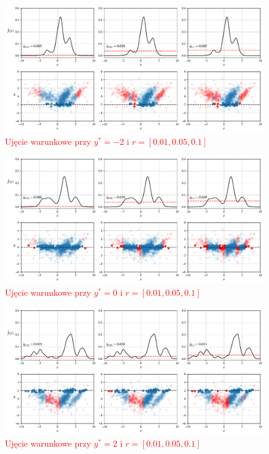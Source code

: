 \documentclass[12pt,a4paper,oneside]{book}
\theoremstyle{definition}
\begin{document}
\begin{figure}[H]
    \centering
    \includegraphics[scale=0.45]{synthetic_data_outliers_ckde_extra1}
    \vspace{-0.5cm} 
    \caption{\textcolor{red}{Ujęcie warunkowe przy $y^*=-2$ i $r=[0.01, 0.05, 0.1]$}}
\end{figure}

\begin{figure}[H]
    \centering
    \includegraphics[scale=0.45]{synthetic_data_outliers_ckde_extra2}
    \vspace{-0.5cm} 
    \caption{\textcolor{red}{Ujęcie warunkowe przy $y^*=0$ i $r=[0.01, 0.05, 0.1]$}}
\end{figure}

\begin{figure}[H]
    \centering
    \includegraphics[scale=0.45]{synthetic_data_outliers_ckde_extra3}
    \vspace{-0.5cm} 
    \caption{\textcolor{red}{Ujęcie warunkowe przy $y^*=2$ i $r=[0.01, 0.05, 0.1]$}}
\end{figure}
\end{document}
